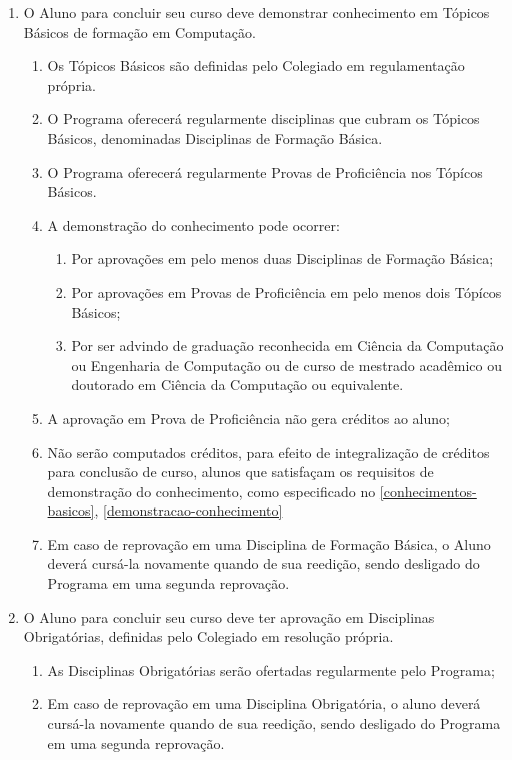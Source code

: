 \documentclass{article}
\newcommand{\grupoMenor}{Colegiado\xspace}
\begin{document}
\begin{enumerate}
	\item \label{conhecimentos-basicos} O Aluno para concluir seu curso deve demonstrar conhecimento em Tópicos Básicos de formação em Computação.
	\begin{enumerate}
		\item Os Tópicos Básicos são definidas pelo \grupoMenor em regulamentação própria.
		\item O Programa oferecerá regularmente disciplinas que cubram os Tópicos Básicos, denominadas Disciplinas de Formação Básica.
		\item O Programa oferecerá regularmente Provas de Proficiência nos Tópícos Básicos.
		\item \label{demonstracao-conhecimento} A demonstração do conhecimento pode ocorrer:

		\begin{enumerate}[label=\Roman*]
			\item Por aprovações em pelo menos duas Disciplinas de Formação Básica;
			\item Por aprovações em Provas de Proficiência em pelo menos dois Tópícos Básicos; 
			\item \label{isentos-conhecimento} Por ser advindo de graduação reconhecida em Ciência da Computação ou Engenharia de Computação ou de curso de mestrado acadêmico ou doutorado em Ciência da Computação ou equivalente.
		\end{enumerate}

		\item A aprovação em Prova de Proficiência não gera créditos ao aluno;

		\item Não serão computados créditos, para efeito de integralização de créditos para conclusão de curso, alunos que satisfaçam os requisitos de demonstração do conhecimento, como especificado no \ref{conhecimentos-basicos}, \ref{demonstracao-conhecimento}

		\item Em caso de reprovação em uma Disciplina de Formação Básica, o Aluno deverá cursá-la novamente quando de sua reedição, sendo desligado do Programa em uma segunda reprovação.
	\end{enumerate}

	\item O Aluno para concluir seu curso deve ter aprovação em Disciplinas Obrigatórias, definidas pelo \grupoMenor em resolução própria.
	\begin{enumerate}
		\item As Disciplinas Obrigatórias serão ofertadas regularmente pelo Programa;
		\item Em caso de reprovação em uma Disciplina Obrigatória, o aluno deverá cursá-la novamente quando de sua reedição, sendo desligado do Programa em uma segunda reprovação.
	\end{enumerate}


\end{enumerate}
\end{document}
